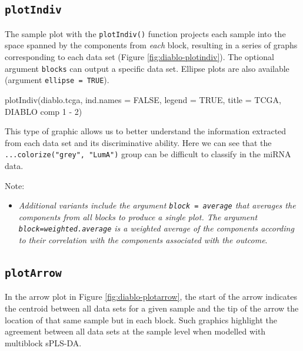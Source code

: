 \documentclass[
]{book}
\newenvironment{Shaded}{\begin{snugshade}}{\end{snugshade}}
\newcommand{\AttributeTok}[1]{\textcolor[rgb]{0.77,0.63,0.00}{#1}}
\newcommand{\ConstantTok}[1]{\textcolor[rgb]{0.00,0.00,0.00}{#1}}
\newcommand{\FunctionTok}[1]{\textcolor[rgb]{0.00,0.00,0.00}{#1}}
\newcommand{\NormalTok}[1]{#1}
\newcommand{\StringTok}[1]{\textcolor[rgb]{0.31,0.60,0.02}{#1}}
\providecommand{\tightlist}{%
  \setlength{\itemsep}{0pt}\setlength{\parskip}{0pt}}
\begin{document}
\hypertarget{plotindiv}{%
\subsection{\texorpdfstring{\texttt{plotIndiv}}{plotIndiv}}\label{plotindiv}}

The sample plot with the \texttt{plotIndiv()} function projects each sample into the space spanned by the components from \emph{each} block, resulting in a series of graphs corresponding to each data set (Figure \ref{fig:diablo-plotindiv}). The optional argument \texttt{blocks} can output a specific data set. Ellipse plots are also available (argument \texttt{ellipse\ =\ TRUE}).

\begin{Shaded}
\begin{Highlighting}[]
\FunctionTok{plotIndiv}\NormalTok{(diablo.tcga, }\AttributeTok{ind.names =} \ConstantTok{FALSE}\NormalTok{, }\AttributeTok{legend =} \ConstantTok{TRUE}\NormalTok{, }
          \AttributeTok{title =} \StringTok{\textquotesingle{}TCGA, DIABLO comp 1 {-} 2\textquotesingle{}}\NormalTok{)}
\end{Highlighting}
\end{Shaded}



This type of graphic allows us to better understand the information extracted from each data set and its discriminative ability. Here we can see that the \texttt{...colorize("grey",\ "LumA")} group can be difficult to classify in the miRNA data.

Note:

\begin{itemize}
\tightlist
\item
  \emph{Additional variants include the argument \texttt{block\ =\ \textquotesingle{}average\textquotesingle{}} that averages the components from all blocks to produce a single plot. The argument \texttt{block=\textquotesingle{}weighted.average\textquotesingle{}} is a weighted average of the components according to their correlation with the components associated with the outcome}.
\end{itemize}

\hypertarget{plotarrow}{%
\subsection{\texorpdfstring{\texttt{plotArrow}}{plotArrow}}\label{plotarrow}}

In the arrow plot in Figure \ref{fig:diablo-plotarrow}, the start of the arrow indicates the centroid between all data sets for a given sample and the tip of the arrow the location of that same sample but in each block. Such graphics highlight the agreement between all data sets at the sample level when modelled with multiblock sPLS-DA.
\end{document}
